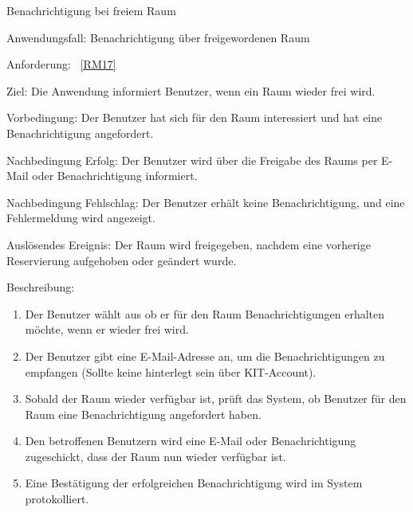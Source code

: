 \begin{function}{50}{Benachrichtigung bei freiem Raum}
    \item[Anwendungsfall:] Benachrichtigung über freigewordenen Raum
    \item[Anforderung:] ~\ref{RM17}
    \item[Ziel:] Die Anwendung informiert Benutzer, wenn ein Raum wieder frei wird.
    \item[Vorbedingung:] Der Benutzer hat sich für den Raum interessiert und hat eine Benachrichtigung angefordert.
    \item[Nachbedingung Erfolg:] Der Benutzer wird über die Freigabe des Raums per E-Mail oder Benachrichtigung informiert.
    \item[Nachbedingung Fehlschlag:] Der Benutzer erhält keine Benachrichtigung, und eine Fehlermeldung wird angezeigt.
    \item[Auslösendes Ereignis:] Der Raum wird freigegeben, nachdem eine vorherige Reservierung aufgehoben oder geändert wurde.
    \item[Beschreibung:] ~
    \begin{enumerate}
        \item Der Benutzer wählt aus ob er für den Raum Benachrichtigungen erhalten möchte, wenn er wieder frei wird.
        \item Der Benutzer gibt eine E-Mail-Adresse an, um die Benachrichtigungen zu empfangen (Sollte keine hinterlegt sein über KIT-Account).
        \item Sobald der Raum wieder verfügbar ist, prüft das System, ob Benutzer für den Raum eine Benachrichtigung angefordert haben.
        \item Den betroffenen Benutzern wird eine E-Mail oder Benachrichtigung zugeschickt, dass der Raum nun wieder verfügbar ist.
        \item Eine Bestätigung der erfolgreichen Benachrichtigung wird im System protokolliert.
    \end{enumerate}
\end{function}


